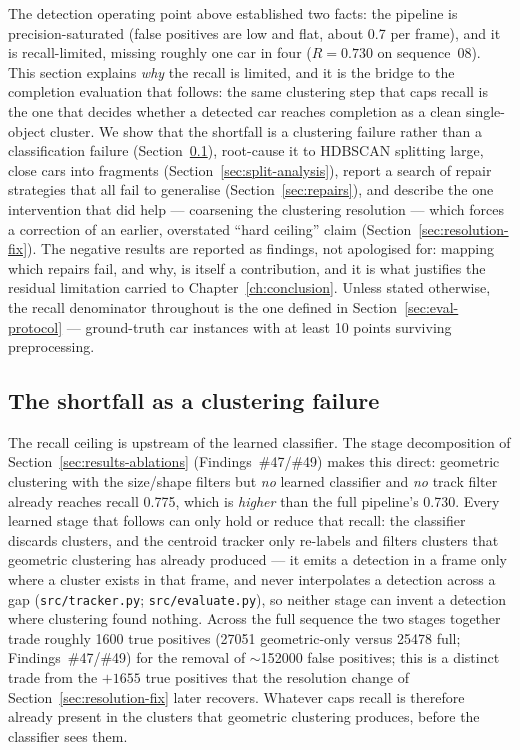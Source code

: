 The detection operating point above established two facts: the pipeline is
precision-saturated (false positives are low and flat, about \num{0.7} per frame),
and it is recall-limited, missing roughly one car in four
($R=\num{0.730}$ on sequence~08). This section explains \emph{why} the recall is
limited, and it is the bridge to the completion evaluation that follows: the same
clustering step that caps recall is the one that decides whether a detected car
reaches completion as a clean single-object cluster. We show that the shortfall is
a clustering failure rather than a classification failure
(Section~\ref{sec:recall-diagnosis}), root-cause it to HDBSCAN splitting large,
close cars into fragments (Section~\ref{sec:split-analysis}), report a search of
repair strategies that all fail to generalise (Section~\ref{sec:repairs}), and
describe the one intervention that did help --- coarsening the clustering
resolution --- which forces a correction of an earlier, overstated ``hard
ceiling'' claim (Section~\ref{sec:resolution-fix}). The negative results are
reported as findings, not apologised for: mapping which repairs fail, and why, is
itself a contribution, and it is what justifies the residual limitation carried to
Chapter~\ref{ch:conclusion}. Unless stated otherwise, the recall denominator
throughout is the one defined in Section~\ref{sec:eval-protocol} --- ground-truth
car instances with at least \num{10} points surviving preprocessing.

\subsection{The shortfall as a clustering failure}
\label{sec:recall-diagnosis}

The recall ceiling is upstream of the learned classifier. The stage decomposition
of Section~\ref{sec:results-ablations} (Findings~\#47/\#49) makes this direct: geometric clustering with the
size/shape filters but \emph{no} learned classifier and \emph{no} track filter
already reaches recall \num{0.775}, which is \emph{higher} than the full pipeline's
\num{0.730}. Every learned stage that follows can only hold or reduce that recall:
the classifier discards clusters, and the centroid tracker only re-labels and
filters clusters that geometric clustering has already produced --- it emits a
detection in a frame only where a cluster exists in that frame, and never
interpolates a detection across a gap (\texttt{src/tracker.py};
\texttt{src/evaluate.py}), so neither stage can invent a detection where clustering
found nothing. Across the full sequence the two stages together trade roughly
\num{1600} true positives (\num{27051} geometric-only versus \num{25478} full;
Findings~\#47/\#49) for the removal of $\sim$\num{152000} false positives; this is a
distinct trade from the $+\num{1655}$ true positives that the resolution change of
Section~\ref{sec:resolution-fix} later recovers. Whatever caps recall is therefore
already present in the clusters that geometric clustering produces, before the
classifier sees them.


